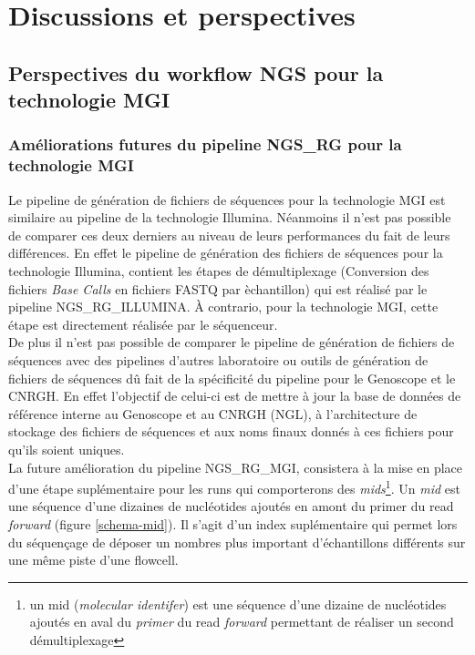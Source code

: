 \section{Discussions et perspectives}
\subsection{Perspectives du workflow NGS pour la technologie MGI}

\subsubsection{Améliorations futures du pipeline NGS\_RG pour la technologie MGI}
Le pipeline de génération de fichiers de séquences pour la technologie MGI est similaire au pipeline de la technologie Illumina. Néanmoins il n'est pas possible de comparer ces deux derniers au niveau de leurs performances du fait de leurs différences. En effet le pipeline de génération des fichiers de séquences pour la technologie Illumina, contient les étapes de démultiplexage (Conversion des fichiers \emph{Base Calls} en fichiers FASTQ par èchantillon) qui est réalisé par le pipeline NGS\_RG\_ILLUMINA. À contrario, pour la technologie MGI, cette étape est directement réalisée par le séquenceur.\\
De plus il n'est pas possible de comparer le pipeline de génération de fichiers de séquences avec des pipelines d'autres laboratoire ou outils de génération de fichiers de séquences dû fait de la spécificité du pipeline pour le Genoscope et le CNRGH. En effet l'objectif de celui-ci est de mettre à jour la base de données de référence interne au Genoscope et au CNRGH (NGL), à l'architecture de stockage des fichiers de séquences et aux noms finaux donnés à ces fichiers pour qu'ils soient uniques.\\

La future amélioration du pipeline NGS\_RG\_MGI, consistera à la mise en place d'une étape suplémentaire pour les runs qui comporterons des \emph{mids}\footnote{un mid (\emph{molecular identifer}) est une séquence d'une dizaine de nucléotides ajoutés en aval du \emph{primer} du read \emph{forward} permettant de réaliser un second démultiplexage}. 
Un \emph{mid} est une séquence d'une dizaines de nucléotides ajoutés en amont du primer du read \emph{forward} (figure \ref{schema-mid}). Il s'agit d'un index suplémentaire qui permet lors du séquençage de déposer un nombres plus important d'échantillons différents sur une même piste d'une flowcell. 

